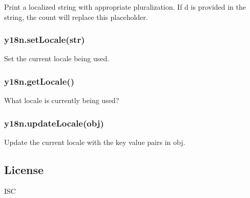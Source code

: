 Print a localized string with appropriate pluralization. If {\ttfamily d} is provided in the string, the {\ttfamily count} will replace this placeholder.

\subsubsection*{y18n.\+set\+Locale(str)}

Set the current locale being used.

\subsubsection*{y18n.\+get\+Locale()}

What locale is currently being used?

\subsubsection*{y18n.\+update\+Locale(obj)}

Update the current locale with the key value pairs in {\ttfamily obj}.

\subsection*{License}

I\+SC 